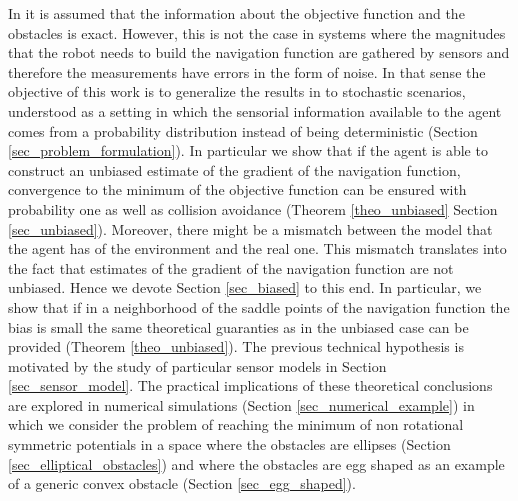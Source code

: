 \documentclass[article]{IEEEtran}
\theoremstyle{definition}
\begin{document}
In \cite{PaternainEtal15} it is assumed that the information about the objective function and the obstacles is exact. However, this is not the case in systems where the magnitudes that the robot needs to build the navigation function are gathered by sensors and therefore the measurements have errors in the form of noise. In that sense the objective of this work is to generalize the results in \cite{PaternainEtal15} to stochastic scenarios, understood as a setting in which the sensorial information available to the agent comes from a probability distribution instead of being deterministic (Section \ref{sec_problem_formulation}). In particular we show that if the agent is able to construct an unbiased estimate of the gradient of the navigation function, convergence to the minimum of the objective function can be ensured with probability one as well as collision avoidance (Theorem \ref{theo_unbiased} Section \ref{sec_unbiased}). Moreover, there might be a mismatch between the model that the agent has of the environment and the real one. This mismatch translates into the fact that estimates of the gradient of the navigation function are not unbiased. Hence we devote Section \ref{sec_biased} to this end. In particular, we show that if in a neighborhood of the saddle points of the navigation function the bias is small the same theoretical guaranties as in the unbiased case can be provided (Theorem \ref{theo_unbiased}). The previous technical hypothesis is motivated by the study of particular sensor models in Section \ref{sec_sensor_model}. The practical implications of these theoretical conclusions are explored in numerical simulations (Section \ref{sec_numerical_example}) in which we consider the problem of reaching the minimum of non rotational symmetric potentials in a space where the obstacles are ellipses (Section \ref{sec_elliptical_obstacles}) and where the obstacles are egg shaped as an example of a generic convex obstacle (Section \ref{sec_egg_shaped}).

%
\end{document}
